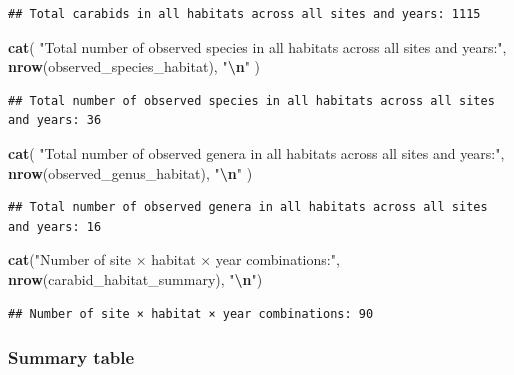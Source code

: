 \documentclass[
]{article}
\newenvironment{Shaded}{\begin{snugshade}}{\end{snugshade}}
\newcommand{\FunctionTok}[1]{\textcolor[rgb]{0.13,0.29,0.53}{\textbf{#1}}}
\newcommand{\NormalTok}[1]{#1}
\newcommand{\SpecialCharTok}[1]{\textcolor[rgb]{0.81,0.36,0.00}{\textbf{#1}}}
\newcommand{\StringTok}[1]{\textcolor[rgb]{0.31,0.60,0.02}{#1}}
\begin{document}
\begin{verbatim}
## Total carabids in all habitats across all sites and years: 1115
\end{verbatim}

\begin{Shaded}
\begin{Highlighting}[]
\FunctionTok{cat}\NormalTok{(}
  \StringTok{"Total number of observed species in all habitats across all sites and years:"}\NormalTok{,}
  \FunctionTok{nrow}\NormalTok{(observed\_species\_habitat),}
  \StringTok{"}\SpecialCharTok{\textbackslash{}n}\StringTok{"}
\NormalTok{)}
\end{Highlighting}
\end{Shaded}

\begin{verbatim}
## Total number of observed species in all habitats across all sites and years: 36
\end{verbatim}

\begin{Shaded}
\begin{Highlighting}[]
\FunctionTok{cat}\NormalTok{(}
  \StringTok{"Total number of observed genera in all habitats across all sites and years:"}\NormalTok{,}
  \FunctionTok{nrow}\NormalTok{(observed\_genus\_habitat),}
  \StringTok{"}\SpecialCharTok{\textbackslash{}n}\StringTok{"}
\NormalTok{)}
\end{Highlighting}
\end{Shaded}

\begin{verbatim}
## Total number of observed genera in all habitats across all sites and years: 16
\end{verbatim}

\begin{Shaded}
\begin{Highlighting}[]
\FunctionTok{cat}\NormalTok{(}\StringTok{"Number of site × habitat × year combinations:"}\NormalTok{, }\FunctionTok{nrow}\NormalTok{(carabid\_habitat\_summary), }\StringTok{"}\SpecialCharTok{\textbackslash{}n}\StringTok{"}\NormalTok{)}
\end{Highlighting}
\end{Shaded}

\begin{verbatim}
## Number of site × habitat × year combinations: 90
\end{verbatim}

\subsubsection{Summary table}\label{summary-table-1}
\end{document}

